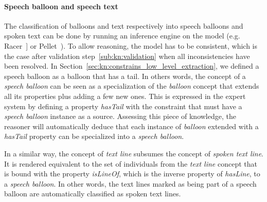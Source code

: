 

\paragraph{Speech balloon and speech text} %
\label{par:speech_balloon_and_speech_text}

The classification of balloons and text respectively into speech balloons and spoken text can be done by running an inference engine on the model (e.g. Racer~\cite{Haarslev2012}] or Pellet~\cite{Sirin2007a}).
To allow reasoning, the model has to be consistent, which is the case after validation step~\ref{sub:kn:validation} when all inconsistencies have been resolved.
In Section~\ref{sec:kn:constrains_low_level_extraction}, we defined a speech balloon as a balloon that has a tail.
In others words, the concept of a \textit{speech balloon} can be seen as a specialization of the \textit{balloon} concept that extends all its properties plus adding a few new ones.
This is expressed in the expert system by defining a property \textit{hasTail} with the constraint that must have a \textit{speech balloon} instance as a source.
Assessing this piece of knowledge, the reasoner will automatically deduce that each instance of \textit{balloon} extended with a \textit{hasTail} property can be specialized into a \textit{speech balloon}.

In a similar way, the concept of \textit{text line} subsumes the concept of \textit{spoken text line}.
It is rendered equivalent to the set of individuals from the \textit{text line} concept that is bound with the property \textit{isLineOf}, which is the inverse property of \textit{hasLine}, to a \textit{speech balloon}.
In other words, the text lines marked as being part of a speech balloon are automatically classified as spoken text lines.


